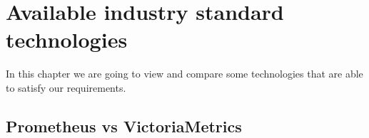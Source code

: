 %

\chapter{Available industry standard technologies \label{ch3}}

In this chapter we are going to view and compare some technologies that are
able to satisfy our requirements.

\section{Prometheus vs VictoriaMetrics}

